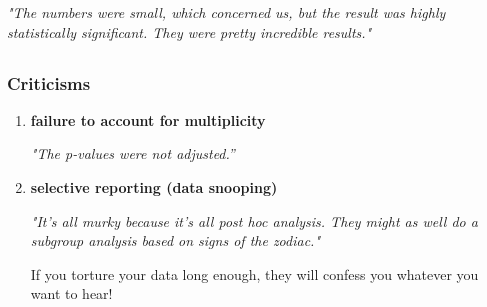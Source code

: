 \documentclass[xcolor={pdftex,dvipsnames,table}]{beamer}
\begin{document}
\begin{frame}
\bigskip

\emph{"The numbers were small, which concerned us, but the result was highly statistically significant. They were pretty incredible results."}

\end{frame}

\subsection{}
\begin{frame}
\frametitle{Criticisms}

\begin{enumerate}
\item \textcolor{cambridgedarkorange}{\textbf{failure to account for multiplicity}}

\bigskip 

\emph{"The p-values were not adjusted.''}
% 
% 
% 


\bigskip 

\item \textcolor{cambridgedarkorange}{\textbf{selective reporting (data snooping)}}

\bigskip 

\emph{"It's all murky because it's all post hoc analysis. They might as well do a subgroup analysis based on signs of the zodiac."}

\bigskip

If you torture your data long enough, they will confess you whatever you want to hear!
\end{enumerate}

\end{frame}
\end{document}
